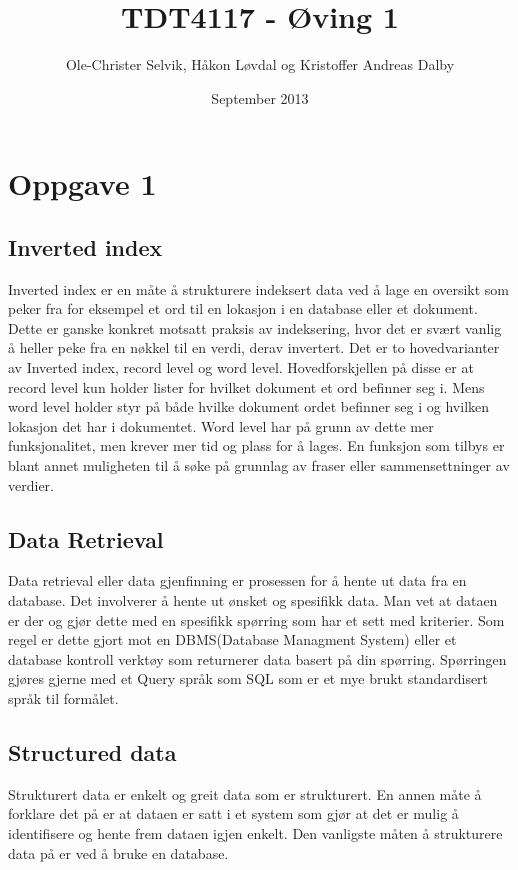 \documentclass[]{article}
\begin{document}
\title{TDT4117 - Øving 1}
\author{Ole-Christer Selvik, Håkon Løvdal og Kristoffer Andreas Dalby}
\date{September 2013}
\maketitle

\section{Oppgave 1}
\subsection{Inverted index}
Inverted index er en måte å strukturere indeksert data ved å lage en oversikt som peker fra for eksempel et ord til en lokasjon i en database eller et dokument. Dette er ganske konkret motsatt praksis av indeksering, hvor det er svært vanlig å heller peke fra en nøkkel til en verdi, derav invertert.
Det er to hovedvarianter av Inverted index, record level og word level. Hovedforskjellen på disse er at record level kun holder lister for hvilket dokument et ord befinner seg i. Mens word level holder styr på både hvilke dokument ordet befinner seg i og hvilken lokasjon det har i dokumentet. Word level har på grunn av dette mer funksjonalitet, men krever mer tid og plass for å lages. En funksjon som tilbys er blant annet muligheten til å søke på grunnlag av fraser eller sammensettninger av verdier.

\subsection{Data Retrieval}
Data retrieval eller data gjenfinning er prosessen for å hente ut data fra en database. Det involverer å hente ut ønsket og spesifikk data. Man vet at dataen er der og gjør dette med en spesifikk spørring som har et sett med kriterier. Som regel er dette gjort mot en DBMS(Database Managment System) eller et database kontroll verktøy som returnerer data basert på din spørring. Spørringen gjøres gjerne med et Query språk som SQL som er et mye brukt standardisert språk til formålet.

\subsection{Structured data}
Strukturert data er enkelt og greit data som er strukturert. En annen måte å forklare det på er at dataen er satt i et system som gjør at det er mulig å identifisere og hente frem dataen igjen enkelt. Den vanligste måten å strukturere data på er ved å bruke en database.  
\end{document}
